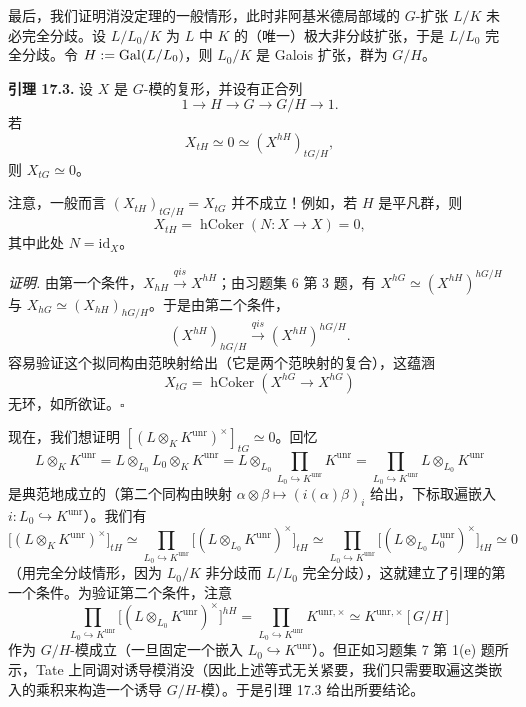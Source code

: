 最后，我们证明消没定理的一般情形，此时非阿基米德局部域的 $G$-扩张 $L/K$ 未必完全分歧。设 $L/L_0/K$ 为 $L$ 中 $K$ 的（唯一）极大非分歧扩张，于是 $L/L_0$ 完全分歧。令 $H:=\operatorname{Gal}(L/L_0)$，则 $L_0/K$ 是 Galois 扩张，群为 $G/H$。

\textbf{引理 17.3.} 设 $X$ 是 $G$-模的复形，并设有正合列
\[
1\to H\to G\to G/H\to 1.
\]
若
\[
X_{tH}\simeq 0\simeq (X^{hH})_{tG/H},
\]
则 $X_{tG}\simeq 0$。

注意，一般而言 $(X_{tH})_{tG/H}=X_{tG}$ 并不成立！例如，若 $H$ 是平凡群，则
\[
X_{tH}=\operatorname{hCoker}(N:X\to X)=0,
\]
其中此处 $N=\mathrm{id}_X$。

\textit{证明.} 由第一个条件，$X_{hH}\xrightarrow{qis}X^{hH}$；由习题集 6 第 3 题，有 $X^{hG}\simeq(X^{hH})^{hG/H}$ 与 $X_{hG}\simeq(X_{hH})_{hG/H}$。于是由第二个条件，
\[
(X^{hH})_{hG/H}\xrightarrow{qis}(X^{hH})^{hG/H}.
\]
容易验证这个拟同构由范映射给出（它是两个范映射的复合），这蕴涵
\[
X_{tG}=\operatorname{hCoker}(X^{hG}\to X^{hG})
\]
无环，如所欲证。\hfill$\square$

现在，我们想证明 $[(L\otimes_K K^{\mathrm{unr}})^\times]_{tG}\simeq 0$。回忆
\[
L\otimes_K K^{\mathrm{unr}}=L\otimes_{L_0}L_0\otimes_K K^{\mathrm{unr}}=L\otimes_{L_0}\prod_{L_0\hookrightarrow K^{\mathrm{unr}}}K^{\mathrm{unr}}=\prod_{L_0\hookrightarrow K^{\mathrm{unr}}}L\otimes_{L_0}K^{\mathrm{unr}}
\]
是典范地成立的（第二个同构由映射 $\alpha\otimes\beta\mapsto (i(\alpha)\beta)_i$ 给出，下标取遍嵌入 $i:L_0\hookrightarrow K^{\mathrm{unr}}$）。我们有
\[
\big[(L\otimes_K K^{\mathrm{unr}})^\times\big]_{tH}\simeq \prod_{L_0\hookrightarrow K^{\mathrm{unr}}}\big[(L\otimes_{L_0}K^{\mathrm{unr}})^\times\big]_{tH}\simeq \prod_{L_0\hookrightarrow K^{\mathrm{unr}}}\big[(L\otimes_{L_0}L_0^{\mathrm{unr}})^\times\big]_{tH}\simeq 0
\]
（用完全分歧情形，因为 $L_0/K$ 非分歧而 $L/L_0$ 完全分歧），这就建立了引理的第一个条件。为验证第二个条件，注意
\[
\prod_{L_0\hookrightarrow K^{\mathrm{unr}}}\big[(L\otimes_{L_0}K^{\mathrm{unr}})^\times\big]^{hH}=\prod_{L_0\hookrightarrow K^{\mathrm{unr}}}K^{\mathrm{unr},\times}\simeq K^{\mathrm{unr},\times}[G/H]
\]
作为 $G/H$-模成立（一旦固定一个嵌入 $L_0\hookrightarrow K^{\mathrm{unr}}$）。但正如习题集 7 第 1(e) 题所示，Tate 上同调对诱导模消没（因此上述等式无关紧要，我们只需要取遍这类嵌入的乘积来构造一个诱导 $G/H$-模）。于是引理 17.3 给出所要结论。
